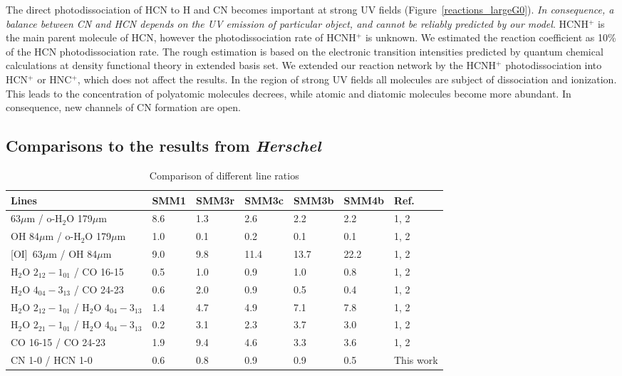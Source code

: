 \documentclass{aa}
\begin{document}
The direct photodissociation of HCN to H and CN becomes important at strong UV fields (Figure~\ref{reactions_largeG0}). \textit{In consequence, a balance between CN and HCN depends on the UV emission of particular object, and cannot be reliably predicted by our model}. HCNH$^+$ is the main parent molecule of HCN, however the photodissociation rate of HCNH$^+$ is unknown. We estimated the reaction coefficient as 10\% of the HCN photodissociation rate. The rough estimation is based on the electronic transition intensities predicted by quantum chemical calculations at density functional theory in extended basis set. We extended our reaction network by the HCNH$^+$ photodissociation into HCN$^+$ or HNC$^+$, which does not affect the results. In the region of strong UV fields all molecules are subject of dissociation and ionization. This leads to the concentration of polyatomic molecules decrees, while atomic and diatomic molecules become more abundant. In consequence, new channels of CN formation are open. 

\subsection{Comparisons to the results from \textit{Herschel}}
\label{subsection:herschel}


\begin{table*} 
\caption{Comparison of different line ratios} 
\centering %
\label{line_ratios} 

\begin{tabular}{l l l l l l l} 
\hline\hline 
Lines & SMM1 & SMM3r & SMM3c & SMM3b & SMM4b & Ref. \\ 
\hline 
[OI] 63$\mu$m / o-H$_2$O 179$\mu$m & 8.6 & 1.3 & 2.6 & 2.2 & 2.2 & 1, 2 \\ 
OH 84$\mu$m  / o-H$_2$O 179$\mu$m & 1.0 & 0.1 & 0.2 & 0.1 & 0.1 & 1, 2 \\ 
\mbox{[OI] 63$\mu$m} / OH 84$\mu$m & 9.0 & 9.8 & 11.4 & 13.7 & 22.2 & 1, 2 \\
H$_2$O $2_{12}-1_{01}$ / CO 16-15 & 0.5 & 1.0 & 0.9 & 1.0 & 0.8 & 1, 2 \\ 
H$_2$O $4_{04}-3_{13}$ / CO 24-23 & 0.6 & 2.0 & 0.9 & 0.5 & 0.4 & 1, 2\\
H$_2$O $2_{12}-1_{01}$ / H$_2$O $4_{04}-3_{13}$ & 1.4 & 4.7 & 4.9 & 7.1 & 7.8 & 1, 2\\
H$_2$O $2_{21}-1_{01}$ / H$_2$O $4_{04}-3_{13}$ & 0.2 & 3.1 & 2.3 & 3.7 & 3.0 & 1, 2\\
CO 16-15 / CO 24-23 & 1.9 & 9.4 & 4.6 & 3.3 & 3.6 & 1, 2 \\
CN 1-0 / HCN 1-0 & 0.6 & 0.8 & 0.9 & 0.9 & 0.5 & This work\\
\hline \end{tabular} 
\end{table*}
\end{document}
